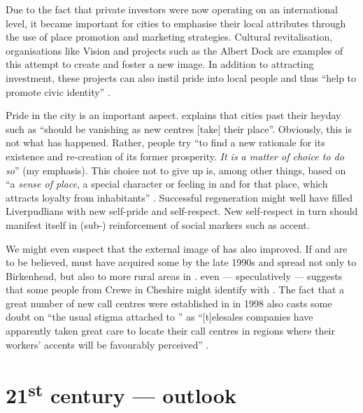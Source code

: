 Due to the fact that private investors were now operating on an international level, it became important for cities to emphasise their local attributes through the use of place promotion and marketing strategies.
Cultural revitalisation, organisations like  Vision and  projects such as the Albert Dock are examples of this attempt to create and foster a new image.
In addition to attracting investment, these projects can also instil pride into local people and thus ``help to promote civic identity'' \citep[cf.][201--203]{percy2003}.

Pride in the city is an important aspect.
\citet[20]{fraser2003} explains that cities past their heyday such as  ``should be vanishing as new centres [take] their place''.
Obviously, this is not what has happened.
Rather, people try ``to find a new rationale for its existence and re-creation of its former prosperity. \emph{It is a matter of  choice to do so}'' (my emphasis).
This  choice not to give up is, among other things, based on ``a \emph{sense of place}, a special character or feeling in and for that place, which attracts loyalty from inhabitants'' \citep[23, emphasis in the original]{fraser2003}.
Successful regeneration might well have filled Liverpudlians with new self-pride and self-respect.
New self-respect in turn should manifest itself in (sub-) reinforcement of social markers such as accent.

We might even suspect that the external image of  has also improved.
If \citet[73]{trudgill1999} and \citet[110]{honeybone2007} are to be believed,  must have acquired some   by the late 1990s and spread not only to Birkenhead, but also to more rural areas in .
\citet[176--177]{montgomery2007a} even --- speculatively --- suggests that some people from Crewe in Cheshire might identify with .
The fact that a great number of new call centres were established in  in 1998 also casts some doubt on ``the usual stigma attached to '' as ``[t]elesales companies have apparently taken great care to locate their call centres in regions where their workers' accents will be favourably perceived'' \citep[3]{foulkesdocherty1999a}.

	\section{21\textsuperscript{st} century --- outlook}\label{sec.hist.21}

